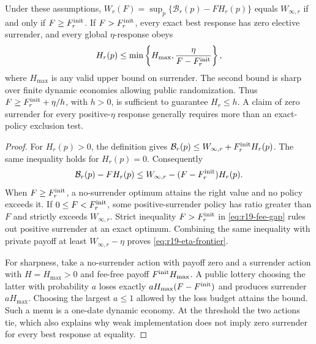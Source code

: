 \begin{theorem}
\label{thm:r19-enforcement}
Under these assumptions, $W_r(F)=\sup_p\{\mathcal B_r(p)-FH_r(p)\}$ equals $W_{\infty,r}$ if and only if $F\geq F^{\rm init}_r$. If $F>F^{\rm init}_r$, every exact best response has zero elective surrender, and every global $\eta$-response obeys
\begin{equation}
 H_r(p)\leq \min\left\{H_{\max},\frac{\eta}{F-F^{\rm init}_r}\right\},
 \label{eq:r19-eta-frontier}
\end{equation}
where $H_{\max}$ is any valid upper bound on surrender. The second bound is sharp over finite dynamic economies allowing public randomization. Thus $F\geq F^{\rm init}_r+\eta/h$, with $h>0$, is sufficient to guarantee $H_r\leq h$. A claim of zero surrender for every positive-$\eta$ response generally requires more than an exact-policy exclusion test.
\end{theorem}
\begin{proof}
For $H_r(p)>0$, the definition gives $\mathcal B_r(p)\leq W_{\infty,r}+F^{\rm init}_rH_r(p)$. The same inequality holds for $H_r(p)=0$. Consequently
\begin{equation}
 \mathcal B_r(p)-FH_r(p)\leq W_{\infty,r}-(F-F^{\rm init}_r)H_r(p).
 \label{eq:r19-fee-gap}
\end{equation}
When $F\geq F^{\rm init}_r$, a no-surrender optimum attains the right value and no policy exceeds it. If $0\leq F<F^{\rm init}_r$, some positive-surrender policy has ratio greater than $F$ and strictly exceeds $W_{\infty,r}$. Strict inequality $F>F^{\rm init}_r$ in \eqref{eq:r19-fee-gap} rules out positive surrender at an exact optimum. Combining the same inequality with private payoff at least $W_{\infty,r}-\eta$ proves \eqref{eq:r19-eta-frontier}.

For sharpness, take a no-surrender action with payoff zero and a surrender action with $H=H_{\max}>0$ and fee-free payoff $F^{\rm init}H_{\max}$. A public lottery choosing the latter with probability $a$ loses exactly $aH_{\max}(F-F^{\rm init})$ and produces surrender $aH_{\max}$. Choosing the largest $a\leq1$ allowed by the loss budget attains the bound. Such a menu is a one-date dynamic economy. At the threshold the two actions tie, which also explains why weak implementation does not imply zero surrender for every best response at equality.
\end{proof}

